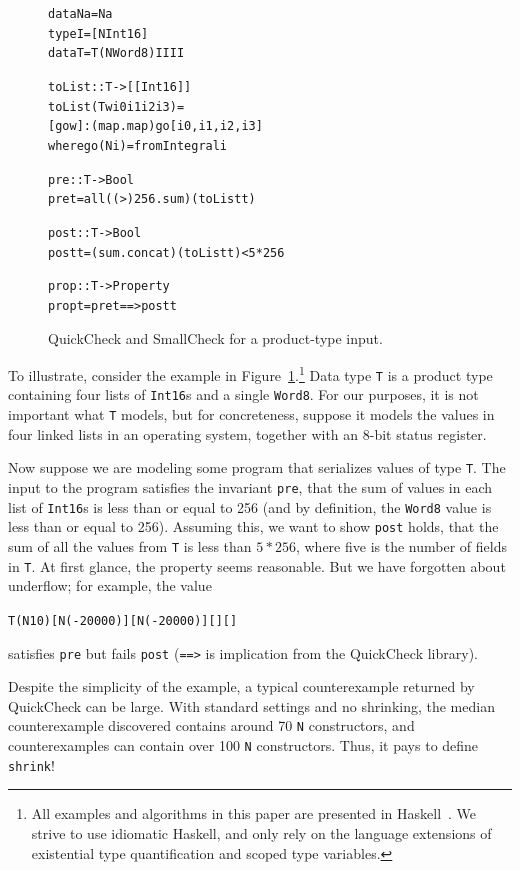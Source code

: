 \documentclass{sigplanconf}
\newenvironment{code}{\begin{alltt}}{\end{alltt}}
\newcommand{\ttp}[1]{\texttt{#1}}
\begin{document}
\begin{figure}[ht]
\begin{code}
data N a = N a
type I   = [N Int16]
data T   = T (N Word8) I I I I

toList :: T -> [[Int16]]
toList (T w i0 i1 i2 i3) =
  [go w] : (map . map) go [i0, i1, i2, i3]
  where go (N i) = fromIntegral i

pre :: T -> Bool
pre t = all ((>) 256 . sum) (toList t)

post :: T -> Bool
post t = (sum . concat) (toList t) < 5 * 256

prop :: T -> Property
prop t = pre t ==> post t
\end{code}
  \caption{QuickCheck and SmallCheck for a product-type input.}
  \label{fig:initial}
\end{figure}

To illustrate, consider the example in Figure~\ref{fig:initial}.\footnote{All
  examples and algorithms in this paper are presented in
  Haskell~\cite{haskell98}.  We strive to use idiomatic Haskell, and only rely
  on the language extensions of existential type quantification and scoped type
  variables.}  Data type \ttp{T} is a product type containing four lists of
\ttp{Int16}s and a single \ttp{Word8}.  For our purposes, it is not important
what \ttp{T} models, but for concreteness, suppose it models the values in four
linked lists in an operating system, together with an 8-bit status register.

Now suppose we are modeling some program that serializes values of type \ttp{T}.
The input to the program satisfies the invariant \ttp{pre}, that the sum of
values in each list of \ttp{Int16}s is less than or equal to 256 (and by
definition, the \ttp{Word8} value is less than or equal to 256).  Assuming this,
we want to show \ttp{post} holds, that the sum of all the values from \ttp{T} is
less than $5 * 256$, where five is the number of fields in \ttp{T}.  At first
glance, the property seems reasonable.  But we have forgotten about underflow;
for example, the value
%
\begin{code}
T (N 10) [N (-20000)] [N (-20000)] [] []
\end{code}
%
\noindent
satisfies \ttp{pre} but fails \ttp{post} (\ttp{==>} is implication from the
QuickCheck library).

Despite the simplicity of the example, a typical counterexample returned by
QuickCheck can be large.  With standard settings and no shrinking, the median
counterexample discovered contains around 70 \ttp{N} constructors, and
counterexamples can contain over 100 \ttp{N} constructors.  Thus, it pays to define
\ttp{shrink}!
\end{document}
